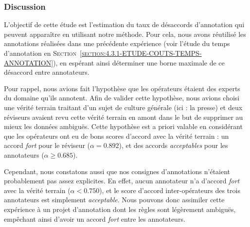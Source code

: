 		\subsubsection{Discussion}
		
			L'objectif de cette étude est l'estimation du taux de désaccords d'annotation qui peuvent apparaître en utilisant notre méthode.
			Pour cela, nous avons réutilisé les annotations réalisées dans une précédente expérience (voir l'étude du temps d'annotation en \textsc{Section~\ref{section:4.3.1-ETUDE-COUTS-TEMPS-ANNOTATION}}), en espérant ainsi déterminer une borne maximale de ce désaccord entre annotateurs.
			
			Pour rappel, nous avions fait l'hypothèse que les opérateurs étaient des experts du domaine qu'ils annotent.
			Afin de valider cette hypothèse, nous avions choisi une vérité terrain traitant d'un sujet de culture générale (ici : la presse) et deux réviseurs avaient revu cette vérité terrain en amont dans le but de supprimer au mieux les données ambiguës.
			Cette hypothèse est a priori valable en considérant que les opérateurs ont eu de bons scores d'accord avec la vérité terrain : un accord \textit{fort} pour le réviseur ($\alpha = 0.892$), et des accords \textit{acceptables} pour les annotateurs ($\alpha \geq 0.685$).
			
			Cependant, nous constatons aussi que nos consignes d'annotations n'étaient probablement pas assez explicites.
			En effet, aucun annotateur n'a d'accord \textit{fort} avec la vérité terrain ($\alpha < 0.750$), et le score d'accord inter-opérateurs des trois annotateurs est simplement \textit{acceptable}.
			Nous pouvons donc assimiler cette expérience à un projet d'annotation dont les règles sont légèrement ambiguës, empêchant ainsi d'avoir un accord \textit{fort} entre les annotateurs.
			
